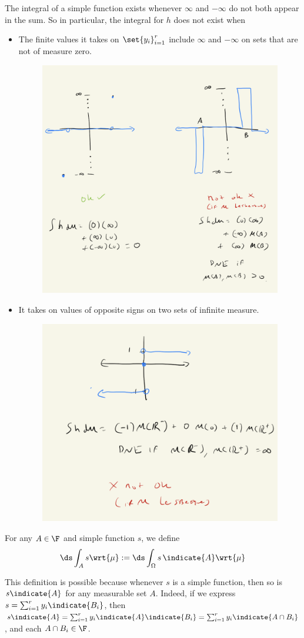 \documentclass{article} %
\begin{document}
\begin{remark}{}
The integral of a simple function exists whenever $\infty$ and  $-\infty$ do not both appear in the sum.  So in particular, the integral for $h$ does not exist when
\begin{itemize}
\item The finite values it takes on $\set{y_i}_{i=1}^r$ include 	$\infty$ and $-\infty$ on sets that are not of measure zero.
\begin{figure}[H]
\centering
\includegraphics[width=.5\textwidth]{images/when_does_integral_of_simple_function_exist_part_1}
\end{figure}

\item It takes on values of opposite signs on two sets of infinite measure.
\begin{figure}[H]
\centering
\includegraphics[width=.5\textwidth]{images/when_does_integral_of_simple_function_exist_part_2}
\end{figure}
\end{itemize}
 
\label{rk:when_does_integral_of_simple_function_exist}
\end{remark}

\begin{remark}{}
For any $A \in \F$ and simple function $s$, we define 
\[ \ds\int_A s \wrt{\mu} := \ds\int_\Omega s \, \indicate{A} \wrt{\mu}  \]

This definition is possible because whenever $s$ is a simple function, then so is $s \indicate{A}$ for any measurable set $A$.   Indeed, if we express $s = \sum_{i=1}^r y_i \indicate{{B_i}}$, then $s \indicate{A} = \sum_{i=1}^r y_i \indicate{A} \indicate{B_i} = \sum_{i=1}^r y_i \indicate{A \cap B_i}$, and each $A \cap B_i \in \F$.  
\label{rk:integrating_simple_functions_over_arbitrary_measurable_subsets}
 \end{remark}
 
\end{document}
